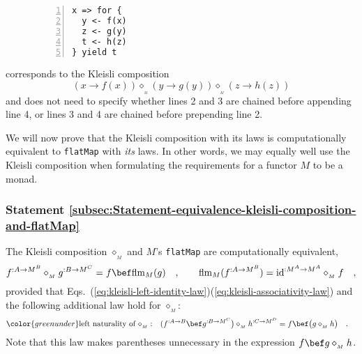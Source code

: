 \begin{wrapfigure}{l}{0.14\columnwidth}%
\vspace{0.1\baselineskip}

\begin{lstlisting}[numbers=left]
x => for {
  y <- f(x)
  z <- g(y)
  t <- h(z)
} yield t
\end{lstlisting}
\vspace{0\baselineskip}
\end{wrapfigure}%

\noindent corresponds to the Kleisli composition\vspace{-0.2\baselineskip}
\[
(x\rightarrow f(x))\diamond_{_{_{M}}}(y\rightarrow g(y))\diamond_{_{_{M}}}(z\rightarrow h(z))
\]
and does not need to specify whether lines 2 and 3 are chained before
appending line 4, or lines 3 and 4 are chained before prepending line
2.

We will now prove that the Kleisli composition with its laws is computationally
equivalent to \lstinline!flatMap! with \emph{its} laws. In other
words, we may equally well use the Kleisli composition when formulating
the requirements for a functor $M$ to be a monad.

\subsubsection{Statement \label{subsec:Statement-equivalence-kleisli-composition-and-flatMap}\ref{subsec:Statement-equivalence-kleisli-composition-and-flatMap}}

The Kleisli composition $\diamond_{_{M}}$ and $M$\textsf{'}s \lstinline!flatMap!
are computationally equivalent,
\begin{equation}
f^{:A\rightarrow M^{B}}\diamond_{_{M}}g^{:B\rightarrow M^{C}}=f\bef\text{flm}_{M}(g)\quad,\quad\quad\text{flm}_{M}(f^{:A\rightarrow M^{B}})=\text{id}^{:M^{A}\rightarrow M^{A}}\diamond_{_{M}}f\quad,\label{eq:express-kleisli-composition-via-flatMap-and-back}
\end{equation}
provided that Eqs.~(\ref{eq:kleisli-left-identity-law})\textendash (\ref{eq:kleisli-associativity-law})
and the following additional law hold for $\diamond_{_{M}}$:
\begin{align}
{\color{greenunder}\text{left naturality of }\diamond_{_{M}}:}\quad & (f^{:A\rightarrow B}\bef g^{:B\rightarrow M^{C}}\big)\diamond_{_{M}}h^{:C\rightarrow M^{D}}=f\bef\big(g\diamond_{_{M}}h\big)\quad.\label{eq:left-naturality-of-kleisli-composition}
\end{align}
Note that this law makes parentheses unnecessary in the expression
$f\bef g\diamond_{_{M}}h$.


